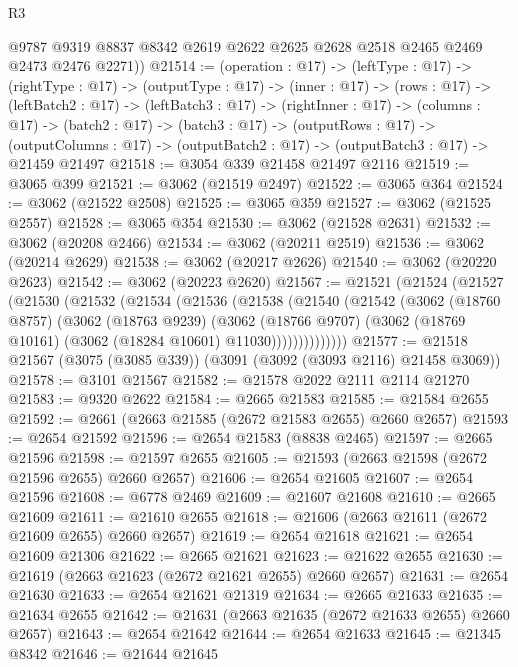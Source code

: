 \begin{lexlean}{R3}
\begin{coremodule}
        @9787
        @9319
        @8837
        @8342
        @2619
        @2622
        @2625
        @2628
        @2518
        @2465
        @2469
        @2473
        @2476
        @2271))
@21514 := (operation : @17) ->
  (leftType : @17) ->
  (rightType : @17) ->
  (outputType : @17) ->
  (inner : @17) ->
  (rows : @17) ->
  (leftBatch2 : @17) ->
  (leftBatch3 : @17) ->
  (rightInner : @17) ->
  (columns : @17) ->
  (batch2 : @17) ->
  (batch3 : @17) ->
  (outputRows : @17) ->
  (outputColumns : @17) -> (outputBatch2 : @17) -> (outputBatch3 : @17) -> @21459 @21497
@21518 := @3054 @339 @21458 @21497 @2116
@21519 := @3065 @399
@21521 := @3062 (@21519 @2497)
@21522 := @3065 @364
@21524 := @3062 (@21522 @2508)
@21525 := @3065 @359
@21527 := @3062 (@21525 @2557)
@21528 := @3065 @354
@21530 := @3062 (@21528 @2631)
@21532 := @3062 (@20208 @2466)
@21534 := @3062 (@20211 @2519)
@21536 := @3062 (@20214 @2629)
@21538 := @3062 (@20217 @2626)
@21540 := @3062 (@20220 @2623)
@21542 := @3062 (@20223 @2620)
@21567 := @21521
    (@21524
      (@21527
        (@21530
          (@21532
            (@21534
              (@21536
                (@21538
                  (@21540
                    (@21542
                      (@3062
                        (@18760 @8757)
                        (@3062
                          (@18763 @9239)
                          (@3062
                            (@18766 @9707)
                            (@3062 (@18769 @10161) (@3062 (@18284 @10601) @11030))))))))))))))
@21577 := @21518 @21567 (@3075 (@3085 @339)) (@3091 (@3092 (@3093 @2116) @21458 @3069))
@21578 := @3101 @21567
@21582 := @21578 @2022 @2111 @2114 @21270
@21583 := @9320 @2622
@21584 := @2665 @21583
@21585 := @21584 @2655
@21592 := @2661 (@2663 @21585 (@2672 @21583 @2655) @2660 @2657)
@21593 := @2654 @21592
@21596 := @2654 @21583 (@8838 @2465)
@21597 := @2665 @21596
@21598 := @21597 @2655
@21605 := @21593 (@2663 @21598 (@2672 @21596 @2655) @2660 @2657)
@21606 := @2654 @21605
@21607 := @2654 @21596
@21608 := @6778 @2469
@21609 := @21607 @21608
@21610 := @2665 @21609
@21611 := @21610 @2655
@21618 := @21606 (@2663 @21611 (@2672 @21609 @2655) @2660 @2657)
@21619 := @2654 @21618
@21621 := @2654 @21609 @21306
@21622 := @2665 @21621
@21623 := @21622 @2655
@21630 := @21619 (@2663 @21623 (@2672 @21621 @2655) @2660 @2657)
@21631 := @2654 @21630
@21633 := @2654 @21621 @21319
@21634 := @2665 @21633
@21635 := @21634 @2655
@21642 := @21631 (@2663 @21635 (@2672 @21633 @2655) @2660 @2657)
@21643 := @2654 @21642
@21644 := @2654 @21633
@21645 := @21345 @8342
@21646 := @21644 @21645

\end{coremodule}
\end{lexlean}
